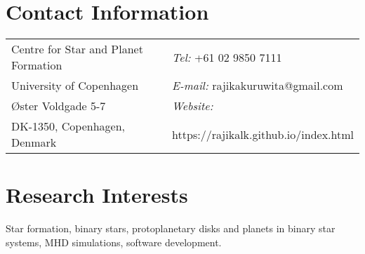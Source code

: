 \documentclass[margin,line]{res}
\begin{document}
	
	\begin{resume}
		\section{\sc Contact Information}
		\vspace{.05in}
		\begin{tabular}{@{}p{3in}p{4in}}
			Centre for Star and Planet Formation  & {\it Tel:}    +61 02 9850 7111 \\         
			University of Copenhagen & {\it E-mail:}  rajikakuruwita@gmail.com\\ 
			Øster Voldgade 5-7 &{\it Website:} \\   
			DK-1350, Copenhagen, Denmark  &  https://rajikalk.github.io/index.html \\     
		\end{tabular}
		
		\section{\sc Research Interests}
		Star formation, binary stars, protoplanetary disks and planets in binary star systems, MHD simulations, software development.
		

\end{resume}
\end{document}
